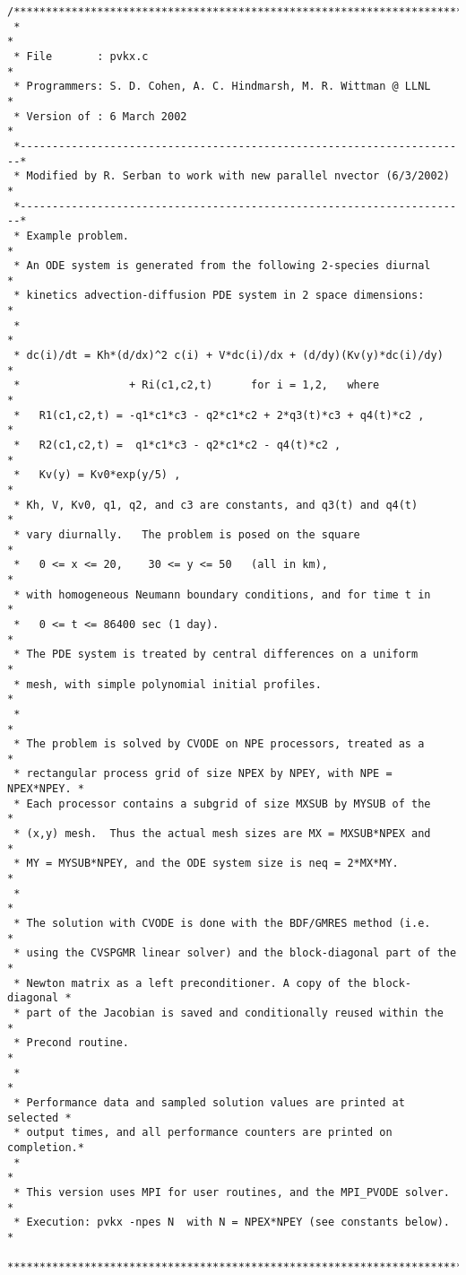 \begin{verbatim}
/************************************************************************
 *                                                                      *
 * File       : pvkx.c                                                  *
 * Programmers: S. D. Cohen, A. C. Hindmarsh, M. R. Wittman @ LLNL      *
 * Version of : 6 March 2002                                            *
 *----------------------------------------------------------------------*
 * Modified by R. Serban to work with new parallel nvector (6/3/2002)   *
 *----------------------------------------------------------------------*
 * Example problem.                                                     *
 * An ODE system is generated from the following 2-species diurnal      *
 * kinetics advection-diffusion PDE system in 2 space dimensions:       *
 *                                                                      *
 * dc(i)/dt = Kh*(d/dx)^2 c(i) + V*dc(i)/dx + (d/dy)(Kv(y)*dc(i)/dy)    *
 *                 + Ri(c1,c2,t)      for i = 1,2,   where              *
 *   R1(c1,c2,t) = -q1*c1*c3 - q2*c1*c2 + 2*q3(t)*c3 + q4(t)*c2 ,       *
 *   R2(c1,c2,t) =  q1*c1*c3 - q2*c1*c2 - q4(t)*c2 ,                    *
 *   Kv(y) = Kv0*exp(y/5) ,                                             *
 * Kh, V, Kv0, q1, q2, and c3 are constants, and q3(t) and q4(t)        *
 * vary diurnally.   The problem is posed on the square                 *
 *   0 <= x <= 20,    30 <= y <= 50   (all in km),                      *
 * with homogeneous Neumann boundary conditions, and for time t in      *
 *   0 <= t <= 86400 sec (1 day).                                       *
 * The PDE system is treated by central differences on a uniform        *
 * mesh, with simple polynomial initial profiles.                       *
 *                                                                      *
 * The problem is solved by CVODE on NPE processors, treated as a       *
 * rectangular process grid of size NPEX by NPEY, with NPE = NPEX*NPEY. *
 * Each processor contains a subgrid of size MXSUB by MYSUB of the      *
 * (x,y) mesh.  Thus the actual mesh sizes are MX = MXSUB*NPEX and      *
 * MY = MYSUB*NPEY, and the ODE system size is neq = 2*MX*MY.           *
 *                                                                      *
 * The solution with CVODE is done with the BDF/GMRES method (i.e.      *
 * using the CVSPGMR linear solver) and the block-diagonal part of the  *
 * Newton matrix as a left preconditioner. A copy of the block-diagonal *
 * part of the Jacobian is saved and conditionally reused within the    *
 * Precond routine.                                                     *
 *                                                                      *
 * Performance data and sampled solution values are printed at selected *
 * output times, and all performance counters are printed on completion.*
 *                                                                      *
 * This version uses MPI for user routines, and the MPI_PVODE solver.   *   
 * Execution: pvkx -npes N  with N = NPEX*NPEY (see constants below).   *
 ************************************************************************/


\end{verbatim}
